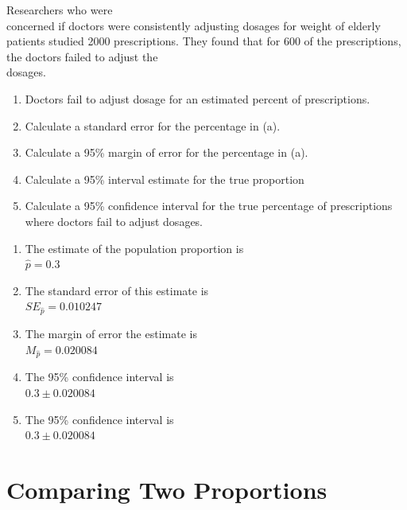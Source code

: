 \documentclass[11pt, chapterprefix=true]{scrbook}\usepackage[]{graphicx}\usepackage[]{color}
\begin{document}
\begin{exercises}
\begin{exercise} %

Researchers who were \\ concerned if doctors were consistently adjusting dosages for weight of elderly patients studied 2000 prescriptions.  They found that for 600 of the  prescriptions, the doctors failed to adjust the \\ dosages.

\begin{enumerate}
\item	Doctors fail to adjust dosage for an estimated \underline{\phantom{xxxxxxxx}}  percent of prescriptions.
\item	Calculate a standard error for the percentage in (a).
\item	Calculate a 95\% margin of error for the percentage in (a).
\item	Calculate a 95\% interval estimate for the true proportion
\item	Calculate a 95\% confidence interval for the true percentage of prescriptions  \\ where doctors fail to adjust dosages.
\end{enumerate}
\end{exercise}
\begin{solution} %


\begin{enumerate}
\item	The estimate of the population proportion is \\ $\hat{p} = 0.3$
\item	The standard error of this estimate is \\ $SE_{\hat{p}} = 0.010247$
\item The margin of error the estimate is \\ $M_{\hat{p}} = 0.020084$
\item	The 95\% confidence interval is \\ $0.3 \pm 0.020084$
\item	The 95\% confidence interval is \\ $0.3 \pm 0.020084$
\end{enumerate}
\end{solution}


\end{exercises}
\onecolumn



\chapter{Comparing Two Proportions }
\label{chap:ch9}
\end{document}
